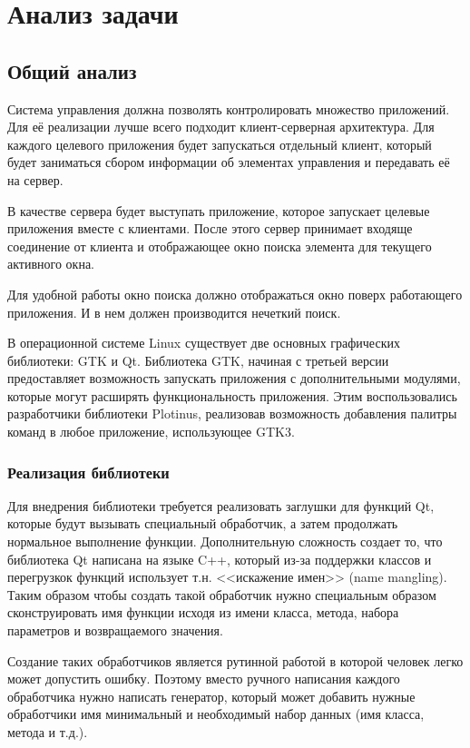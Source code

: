 \chapter{Анализ задачи}

\section{Общий анализ}

Система управления должна позволять контролировать множество приложений. Для её
реализации лучше всего подходит клиент-серверная архитектура. Для каждого
целевого приложения будет запускаться отдельный клиент, который будет заниматься
сбором информации об элементах управления и передавать её на сервер.

В качестве сервера будет выступать приложение, которое запускает целевые
приложения вместе с клиентами. После этого сервер принимает входяще соединение
от клиента и отображающее окно поиска элемента для текущего активного окна.

Для удобной работы окно поиска должно отображаться окно поверх работающего
приложения. И в нем должен производится нечеткий поиск.

В операционной системе Linux существует две основных графических библиотеки: GTK
и Qt. Библиотека GTK, начиная с третьей версии предоставляет возможность
запускать приложения с дополнительными модулями, которые могут расширять
функциональность приложения. Этим воспользовались разработчики библиотеки
Plotinus, реализовав возможность добавления палитры команд в любое приложение,
использующее GTK3.

\subsection{Реализация библиотеки}

Для внедрения библиотеки требуется реализовать заглушки для функций Qt, которые
будут вызывать специальный обработчик, а затем продолжать нормальное выполнение
функции. Дополнительную сложность создает то, что библиотека Qt написана на
языке C++, который из-за поддержки классов и перегрузкок функций использует т.н.
<<искажение имен>> (name mangling). Таким образом чтобы создать такой обработчик
нужно специальным образом сконструировать имя функции исходя из имени класса,
метода, набора параметров и возвращаемого значения.

Создание таких обработчиков является рутинной работой в которой человек легко
может допустить ошибку. Поэтому вместо ручного написания каждого обработчика
нужно написать генератор, который может добавить нужные обработчики имя
минимальный и необходимый набор данных (имя класса, метода и т.д.).


